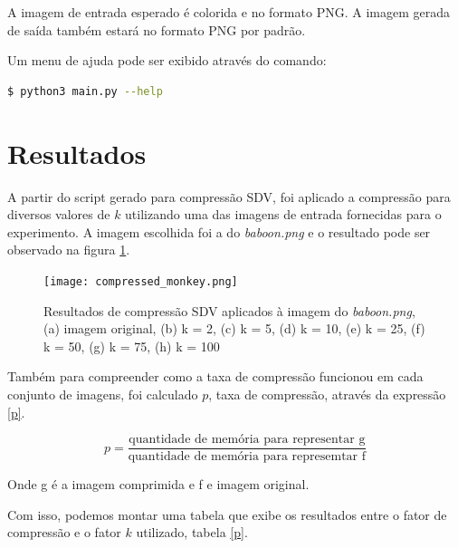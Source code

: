\documentclass[conference]{IEEEtran}
\begin{document}
        A imagem de entrada esperado é colorida e no formato PNG. A imagem gerada de saída também estará no formato PNG por padrão.

        Um menu de ajuda pode ser exibido através do comando:

        \begin{lstlisting}[language=bash]
        $ python3 main.py --help
        \end{lstlisting}

\section{Resultados}

    A partir do script gerado para compressão SDV, foi aplicado a compressão para diversos valores de $k$ utilizando uma das imagens de entrada fornecidas para o experimento.
    A imagem escolhida foi a do \textit{baboon.png} e o resultado pode ser observado na figura \ref{compressed_monkey}.

    \begin{figure}[htb]
        \centering
        \texttt{[image: compressed\_monkey.png]}
        \caption{Resultados de compressão SDV aplicados à imagem do \textit{baboon.png}, (a) imagem original, (b) k = 2, (c) k = 5, (d) k = 10, (e) k = 25, (f) k = 50, (g) k = 75, (h) k = 100}
        \label{compressed_monkey}
    \end{figure}

    Também para compreender como a taxa de compressão funcionou em cada conjunto de imagens, foi calculado $p$, taxa de compressão, através da expressão \ref{p}.

    \begin{equation}
        p = \dfrac{\text{quantidade de memória para representar g}}{\text{quantidade de memória para represemtar f}}
    \end{equation}

    Onde g é a imagem comprimida e f e imagem original.

    Com isso, podemos montar uma tabela que exibe os resultados entre o fator de compressão e o fator $k$ utilizado, tabela \ref{p}.
\end{document}
